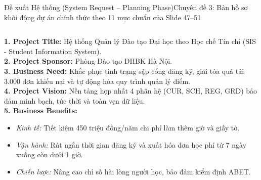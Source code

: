 \documentclass[aspectratio=169, 10pt]{beamer}
\begin{document}
\begin{frame}[t]{Đề xuất Hệ thống (System Request -- Planning Phase)}{Chuyên đề 3: Bản hồ sơ khởi động dự án chính thức theo 11 mục chuẩn của Slide 47--51}
  \vspace{-0.15cm}
  \begin{columns}[T]
      \begin{neutralBox}
        \tiny
        \textbf{\color{NavyDark}1. Project Title:} Hệ thống Quản lý Đào tạo Đại học theo Học chế Tín chỉ (SIS - Student Information System).\\
        \textbf{\color{NavyDark}2. Project Sponsor:} Phòng Đào tạo ĐHBK Hà Nội.\\
        \textbf{\color{NavyDark}3. Business Need:} Khắc phục tình trạng sập cổng đăng ký, giải tỏa quá tải 3.000 đơn khiếu nại và tự động hóa quy trình quản lý điểm.\\
        \textbf{\color{NavyDark}4. Project Vision:} Nền tảng hợp nhất 4 phân hệ (CUR, SCH, REG, GRD) bảo đảm minh bạch, tức thời và toàn vẹn dữ liệu.\\
        \textbf{\color{NavyDark}5. Business Benefits:}
        \begin{itemize}\itemsep0.5pt
          \item \textit{Kinh tế:} Tiết kiệm 450 triệu đồng/năm chi phí làm thêm giờ và giấy tờ.
          \item \textit{Vận hành:} Rút ngắn thời gian đăng ký và xuất hóa đơn học phí từ 7 ngày xuống còn dưới 1 giờ.
          \item \textit{Chiến lược:} Nâng cao chỉ số hài lòng người học, bảo đảm kiểm định ABET.
        \end{itemize}
      \end{neutralBox}


\end{columns}
\end{frame}
\end{document}
